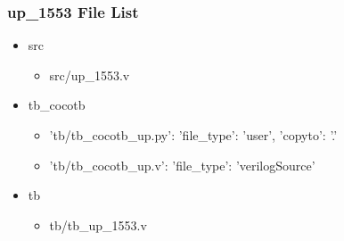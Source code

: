 \subsubsection{up\_1553 File List}
\begin{itemize}
\item src
	\begin{itemize}
	\item src/up\_1553.v
	\end{itemize}
\item tb\_cocotb
	\begin{itemize}
	\item {'tb/tb\_cocotb\_up.py': {'file\_type': 'user', 'copyto': '.'}}
	\item {'tb/tb\_cocotb\_up.v': {'file\_type': 'verilogSource'}}
	\end{itemize}
\item tb
	\begin{itemize}
	\item tb/tb\_up\_1553.v
	\end{itemize}
\end{itemize}
